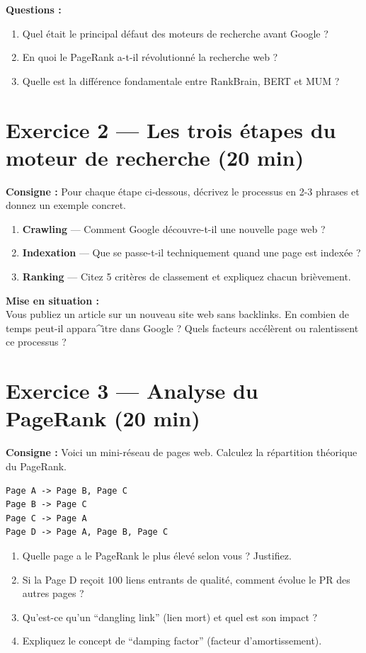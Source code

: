 \documentclass[12pt,a4paper]{report}
\begin{document}
\textbf{Questions :}
\begin{enumerate}
    \item Quel \'{e}tait le principal d\'{e}faut des moteurs de recherche avant Google ?
    \item En quoi le PageRank a-t-il r\'{e}volutionn\'{e} la recherche web ?
    \item Quelle est la diff\'{e}rence fondamentale entre RankBrain, BERT et MUM ?
\end{enumerate}

\section{Exercice 2 --- Les trois \'{e}tapes du moteur de recherche (20 min)}

\textbf{Consigne :} Pour chaque \'{e}tape ci-dessous, d\'{e}crivez le processus en 2-3 phrases et donnez un exemple concret.

\begin{enumerate}
    \item \textbf{Crawling} --- Comment Google d\'{e}couvre-t-il une nouvelle page web ?
    \item \textbf{Indexation} --- Que se passe-t-il techniquement quand une page est index\'{e}e ?
    \item \textbf{Ranking} --- Citez 5 crit\`{e}res de classement et expliquez chacun bri\`{e}vement.
\end{enumerate}

\textbf{Mise en situation :}\\
Vous publiez un article sur un nouveau site web sans backlinks. En combien de temps peut-il appara^{\^\i}tre dans Google ? Quels facteurs acc\'{e}l\`{e}rent ou ralentissent ce processus ?

\section{Exercice 3 --- Analyse du PageRank (20 min)}

\textbf{Consigne :} Voici un mini-r\'{e}seau de pages web. Calculez la r\'{e}partition th\'{e}orique du PageRank.

\begin{lstlisting}
Page A -> Page B, Page C
Page B -> Page C
Page C -> Page A
Page D -> Page A, Page B, Page C
\end{lstlisting}

\begin{enumerate}
    \item Quelle page a le PageRank le plus \'{e}lev\'{e} selon vous ? Justifiez.
    \item Si la Page D re\c{c}oit 100 liens entrants de qualit\'{e}, comment \'{e}volue le PR des autres pages ?
    \item Qu'est-ce qu'un ``dangling link'' (lien mort) et quel est son impact ?
    \item Expliquez le concept de ``damping factor'' (facteur d'amortissement).
\end{enumerate}
\end{document}
